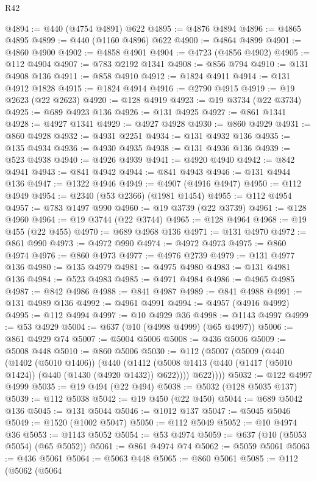 \begin{lexlean}{R42}
\begin{coremodule}
@4894 := @440 (@4754 @4891) @622
@4895 := @4876 @4894
@4896 := @4865 @4895
@4899 := @440 (@1160 @4896) @622
@4900 := @4864 @4899
@4901 := @4860 @4900
@4902 := @4858 @4901
@4904 := @4723 (@4856 @4902)
@4905 := @112 @4904
@4907 := @783 @2192 @1341
@4908 := @856 @794
@4910 := @131 @4908 @136
@4911 := @858 @4910
@4912 := @1824 @4911
@4914 := @131 @4912 @1828
@4915 := @1824 @4914
@4916 := @2790 @4915
@4919 := @19 @2623 (@22 @2623)
@4920 := @128 @4919
@4923 := @19 @3734 (@22 @3734)
@4925 := @689 @4923 @136
@4926 := @131 @4925
@4927 := @861 @1341
@4928 := @4927 @1341
@4929 := @4927 @4928
@4930 := @860 @4929
@4931 := @860 @4928
@4932 := @4931 @2251
@4934 := @131 @4932 @136
@4935 := @135 @4934
@4936 := @4930 @4935
@4938 := @131 @4936 @136
@4939 := @523 @4938
@4940 := @4926 @4939
@4941 := @4920 @4940
@4942 := @842 @4941
@4943 := @841 @4942
@4944 := @841 @4943
@4946 := @131 @4944 @136
@4947 := @1322 @4946
@4949 := @4907 (@4916 @4947)
@4950 := @112 @4949
@4954 := @2340 (@53 @2366) (@1981 @1454)
@4955 := @112 @4954
@4957 := @783 @1497 @990
@4960 := @19 @3739 (@22 @3739)
@4961 := @128 @4960
@4964 := @19 @3744 (@22 @3744)
@4965 := @128 @4964
@4968 := @19 @455 (@22 @455)
@4970 := @689 @4968 @136
@4971 := @131 @4970
@4972 := @861 @990
@4973 := @4972 @990
@4974 := @4972 @4973
@4975 := @860 @4974
@4976 := @860 @4973
@4977 := @4976 @2739
@4979 := @131 @4977 @136
@4980 := @135 @4979
@4981 := @4975 @4980
@4983 := @131 @4981 @136
@4984 := @523 @4983
@4985 := @4971 @4984
@4986 := @4965 @4985
@4987 := @842 @4986
@4988 := @841 @4987
@4989 := @841 @4988
@4991 := @131 @4989 @136
@4992 := @4961 @4991
@4994 := @4957 (@4916 @4992)
@4995 := @112 @4994
@4997 := @10 @4929 @36
@4998 := @1143 @4997
@4999 := @53 @4929
@5004 := @637 (@10 (@4998 @4999) (@65 @4997))
@5006 := @861 @4929 @74
@5007 := @5004 @5006
@5008 := @436 @5006
@5009 := @5008 @448
@5010 := @860 @5006
@5030 := @112
    (@5007
      (@5009
        (@440
          (@1402 (@5010 @1406))
          (@440
            (@1412 (@5008 @1413 (@440 (@1417 (@5010 @1424)) (@440 (@1430 (@4920 @1432)) @622))))
            @622))))
@5032 := @122 @4997 @4999
@5035 := @19 @494 (@22 @494)
@5038 := @5032 (@128 @5035 @137)
@5039 := @112 @5038
@5042 := @19 @450 (@22 @450)
@5044 := @689 @5042 @136
@5045 := @131 @5044
@5046 := @1012 @137
@5047 := @5045 @5046
@5049 := @1520 (@1002 @5047)
@5050 := @112 @5049
@5052 := @10 @4974 @36
@5053 := @1143 @5052
@5054 := @53 @4974
@5059 := @637 (@10 (@5053 @5054) (@65 @5052))
@5061 := @861 @4974 @74
@5062 := @5059 @5061
@5063 := @436 @5061
@5064 := @5063 @448
@5065 := @860 @5061
@5085 := @112
    (@5062
      (@5064

\end{coremodule}
\end{lexlean}
